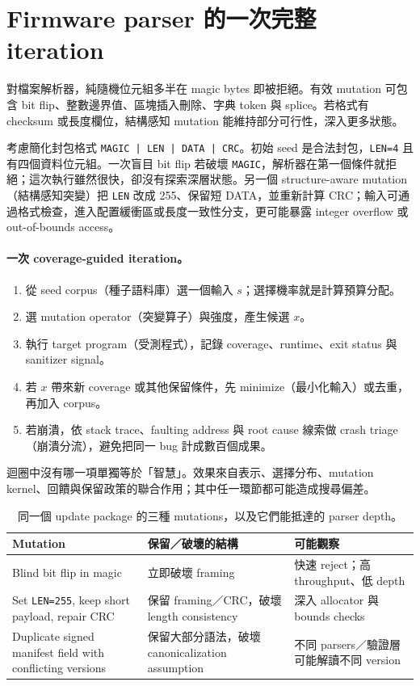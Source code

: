 \documentclass[11pt,a4paper,oneside,openany]{book}
\begin{document}
\section{Firmware parser 的一次完整 iteration}
對檔案解析器，純隨機位元組多半在 magic bytes 即被拒絕。有效 mutation 可包含 bit flip、整數邊界值、區塊插入刪除、字典 token 與 splice。若格式有 checksum 或長度欄位，結構感知 mutation 能維持部分可行性，深入更多狀態。

考慮簡化封包格式 \texttt{MAGIC | LEN | DATA | CRC}。初始 seed 是合法封包，\texttt{LEN=4} 且有四個資料位元組。一次盲目 bit flip 若破壞 \texttt{MAGIC}，解析器在第一個條件就拒絕；這次執行雖然很快，卻沒有探索深層狀態。另一個 structure-aware mutation（結構感知突變）把 \texttt{LEN} 改成 255、保留短 DATA，並重新計算 CRC；輸入可通過格式檢查，進入配置緩衝區或長度一致性分支，更可能暴露 integer overflow 或 out-of-bounds access。

\paragraph{一次 coverage-guided iteration。}
\begin{enumerate}
\item 從 seed corpus（種子語料庫）選一個輸入 $s$；選擇機率就是計算預算分配。
\item 選 mutation operator（突變算子）與強度，產生候選 $x$。
\item 執行 target program（受測程式），記錄 coverage、runtime、exit status 與 sanitizer signal。
\item 若 $x$ 帶來新 coverage 或其他保留條件，先 minimize（最小化輸入）或去重，再加入 corpus。
\item 若崩潰，依 stack trace、faulting address 與 root cause 線索做 crash triage（崩潰分流），避免把同一 bug 計成數百個成果。
\end{enumerate}
迴圈中沒有哪一項單獨等於「智慧」。效果來自表示、選擇分布、mutation kernel、回饋與保留政策的聯合作用；其中任一環節都可能造成搜尋偏差。

\begin{table}[htbp]
\centering
\caption{同一個 update package 的三種 mutations，以及它們能抵達的 parser depth。}
\label{tab:mutation-depth}
\begin{tabularx}{\textwidth}{@{}lYY@{}}
\toprule
Mutation & 保留／破壞的結構 & 可能觀察 \\
\midrule
Blind bit flip in magic & 立即破壞 framing & 快速 reject；高 throughput、低 depth \\
Set \texttt{LEN=255}, keep short payload, repair CRC & 保留 framing／CRC，破壞 length consistency & 深入 allocator 與 bounds checks \\
Duplicate signed manifest field with conflicting versions & 保留大部分語法，破壞 canonicalization assumption & 不同 parsers／驗證層可能解讀不同 version \\
\bottomrule
\end{tabularx}
\end{table}
\end{document}
